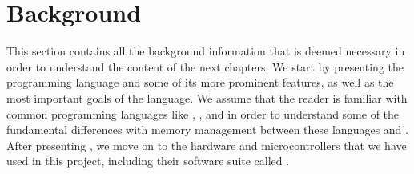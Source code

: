 
\chapter{Background}
\label{chap:background}

This section contains all the background information that is deemed necessary in order to understand the content of the next chapters.
We start by presenting the {\rust} programming language and some of its more prominent features, as well as the most important goals of the language.
We assume that the reader is familiar with common programming languages like {\Java}, {\C}, and {\Cpp} in order to understand some of the fundamental differences with memory management between these languages and {\rust}.
After presenting {\rust}, we move on to the hardware and microcontrollers that we have used in this project, including their software suite called \emlib.








% 
% 
% 
